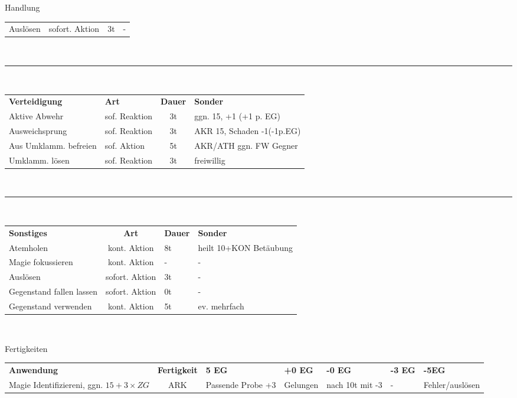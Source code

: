 \documentclass[a4paper, 11pt]{article}
\begin{document}
\begin{multicols}{2}
\begin{spmbox}{Handlung}
\begin{tabularx}{\linewidth}{l X c l}
                Auslösen & sofort. Aktion & 3t & - \\
        \end{tabularx}\\
        \rule{\linewidth}{.2em}\\
        \begin{tabularx}{\linewidth}{l X c l}
                \rowcolor{spmtabelle2}
                \textbf{Verteidigung} & \textbf{Art} & \textbf{Dauer} & \textbf{Sonder} \\
                Aktive Abwehr & sof. Reaktion & 3t & ggn. 15, +1 (+1 p. EG) \\
                Ausweichsprung & sof. Reaktion & 3t & AKR 15, Schaden -1(-1p.EG) \\
                Aus Umklamm. befreien & sof. Aktion & 5t & AKR/ATH ggn. FW Gegner \\
                Umklamm. lösen & sof. Reaktion & 3t & freiwillig \\
        \end{tabularx}\\
        \rule{\linewidth}{.2em}\\
        \begin{tabularx}{\linewidth}{l c X l}
                \rowcolor{spmtabelle2}
                \textbf{Sonstiges} & \textbf{Art} & \textbf{Dauer} & \textbf{Sonder} \\
                Atemholen& kont. Aktion & 8t & heilt 10+KON Betäubung \\
                Magie fokussieren& kont. Aktion & - & - \\
                Auslösen & sofort. Aktion & 3t & - \\
                Gegenstand fallen lassen & sofort. Aktion & 0t & -\\
                Gegenstand verwenden & kont. Aktion & 5t & ev. mehrfach \\
        \end{tabularx}\\        
\end{spmbox}
\begin{spmbox}{Fertigkeiten}
\tiny
        \begin{tabularx}{\linewidth}{X c l l l l l }
                \rowcolor{spmtabelle2}
                \textbf{Anwendung} & \textbf{Fertigkeit} & \textbf{5 EG}  &\textbf{+0 EG} & \textbf{-0 EG} & \textbf{-3 EG} & \textbf{-5EG} \\
                Magie Identifiziereni, ggn. $15+3\times ZG$ & ARK & Passende Probe +3& Gelungen & nach 10t mit -3 & - & Fehler/auslösen \\ 

\end{tabularx}
\end{spmbox}
\end{multicols}
\end{document}
